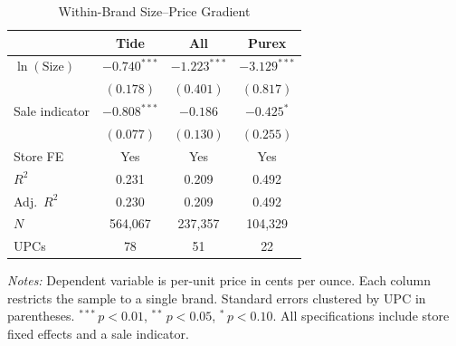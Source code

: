 \begin{table}[htbp]
\centering
\caption{Within-Brand Size--Price Gradient}
\label{tab:within_brand}
\small
\begin{tabular}{lccc}
\toprule
 & Tide & All & Purex \\
\midrule
$\ln(\text{Size})$ & $-0.740^{***}$ & $-1.223^{***}$ & $-3.129^{***}$ \\
 & $(0.178)$ & $(0.401)$ & $(0.817)$ \\
[4pt]
Sale indicator & $-0.808^{***}$ & $-0.186$ & $-0.425^{*}$ \\
 & $(0.077)$ & $(0.130)$ & $(0.255)$ \\
\midrule
Store FE & Yes & Yes & Yes \\
\midrule
$R^2$ & 0.231 & 0.209 & 0.492 \\
Adj.\ $R^2$ & 0.230 & 0.209 & 0.492 \\
$N$ & 564,067 & 237,357 & 104,329 \\
UPCs & 78 & 51 & 22 \\
\bottomrule
\end{tabular}

\medskip\par\noindent\footnotesize
\textit{Notes:} Dependent variable is per-unit price in cents per ounce. Each column restricts the sample to a single brand. Standard errors clustered by UPC in parentheses. $^{***}\,p<0.01$, $^{**}\,p<0.05$, $^{*}\,p<0.10$. All specifications include store fixed effects and a sale indicator.
\end{table}
